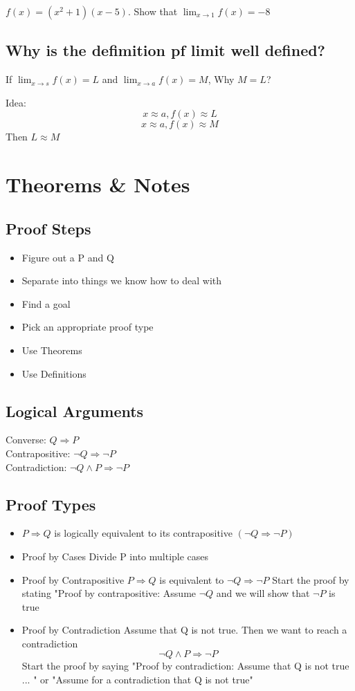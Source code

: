 \documentclass{report}
\begin{document}
     {
      $f(x) = (x^2+1)(x-5)$.  Show that $\lim_{x \to 1} f(x) = -8$
    }

    \subsection{Why is the defimition pf limit well defined?}%
    If $\lim_{x \to s} f(x) = L$ and $\lim_{x \to a} f(x) = M$, Why
    $M=L$?
      
    Idea:
      \[ x \approx a, f(x) \approx L \]
      \[ x \approx a, f(x) \approx M \]
      Then $L \approx M$

\newpage
\section*{Theorems \& Notes}%
    \subsection*{Proof Steps}
      \begin{itemize}
        \item Figure out a P and Q
        \item Separate into things we know how to deal with
        \item Find a goal
        \item Pick an appropriate proof type
        \item Use Theorems
        \item Use Definitions
      \end{itemize}
    \subsection*{Logical Arguments}%
    Converse: $Q \Longrightarrow P$ \\
    Contrapositive: $\neg Q \Longrightarrow \neg P$\\
    Contradiction: $ \neg Q \wedge P \Longrightarrow \neg P $

    \subsection*{Proof Types}%
    \begin{itemize}
    \item $P \Longrightarrow Q$ is logically equivalent to its contrapositive $(\neg Q \Longrightarrow \neg P)$
    \item Proof by Cases
      Divide P into multiple cases
    \item Proof by Contrapositive
      $P \Longrightarrow Q $ is equivalent to $\neg Q \Longrightarrow \neg P$
      Start the proof by stating "Proof by contrapositive: Assume $\neg Q$
      and we will show that $\neg P$ is true

    \item Proof by Contradiction
      Assume that Q is not true.  Then we want to reach a contradiction
        \[ \neg Q \wedge P \Longrightarrow \neg P \]
      Start the proof by saying "Proof by contradiction:  Assume that
      Q is not true ... "  or "Assume for a contradiction that Q is not
      true"
    \end{itemize}
\end{document}
